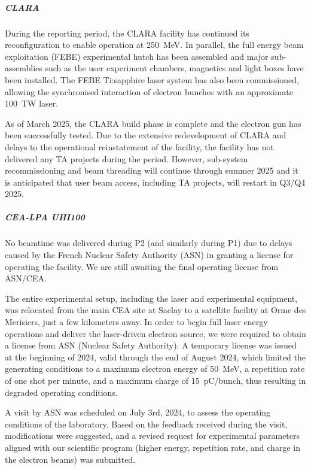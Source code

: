 {%

\subparagraph{CLARA}
 
During the reporting period, the CLARA facility has continued its reconfiguration to enable operation at \SI{250}{MeV}. 
In parallel, the full energy beam exploitation (FEBE) experimental hutch has been assembled and major sub-assemblies such as the user experiment chambers, magnetics and light boxes have been installed. The FEBE Ti:sapphire laser system has also been commissioned, allowing the synchronised interaction of electron bunches with an approximate \SI{100}{TW} laser. 

As of March 2025, the CLARA build phase is complete and the electron gun has been successfully tested. Due to the extensive redevelopment of CLARA and delays to the operational reinstatement of the facility, the facility has not delivered any TA projects during the period. However, sub-system recommissioning and beam threading will continue through summer 2025 and it is anticipated that user beam access, including TA projects, will restart in Q3/Q4 2025.


\subparagraph{CEA-LPA UHI100} 

No beamtime was delivered during P2 (and similarly during P1) due to delays caused by the French Nuclear Safety Authority (ASN) in granting a license for operating the facility. We are still awaiting the final operating license from ASN/CEA.

The entire experimental setup, including the laser and experimental equipment, was relocated from the main CEA site at Saclay to a satellite facility at Orme des Merisiers, just a few kilometers away. In order to begin full laser energy operations and deliver the laser-driven electron source, we were required to obtain a license from ASN (Nuclear Safety Authority). A temporary license was issued at the beginning of 2024, valid through the end of August 2024, which limited the generating conditions to a maximum electron energy of \SI{50}{MeV}, a repetition rate of one shot per minute, and a maximum charge of \SI{15}{\pico C/bunch}, thus resulting in degraded operating conditions.

A visit by ASN was scheduled on July 3rd, 2024, to assess the operating conditions of the laboratory. Based on the feedback received during the visit, modifications were suggested, and a revised request for experimental parameters aligned with our scientific program (higher energy, repetition rate, and charge in the electron beams) was submitted.

}
